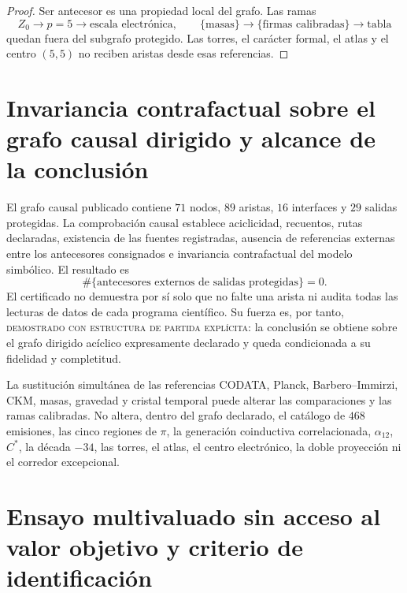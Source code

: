 \begin{proof}
Ser antecesor es una propiedad local del grafo. Las ramas
\[
 Z_0\longrightarrow p=5\longrightarrow\text{escala electrónica},
\qquad
 \{\text{masas}\}\longrightarrow\{\text{firmas calibradas}\}
 \longrightarrow\text{tabla}
\]
quedan fuera del subgrafo protegido. Las torres, el carácter formal, el
atlas y el centro \((5,5)\) no reciben aristas desde esas referencias.
\end{proof}

\section{Invariancia contrafactual sobre el grafo causal dirigido y alcance de la conclusión}
\label{sec:certificado-independencia-prospectiva}

El grafo causal publicado contiene \(71\) nodos, \(89\) aristas,
\(16\) interfaces y
\(29\) salidas protegidas. La comprobación causal establece aciclicidad, recuentos,
rutas declaradas, existencia de las fuentes registradas, ausencia de
referencias externas entre los antecesores consignados e invariancia
contrafactual del modelo simbólico. El resultado es
\[
 \#\{\text{antecesores externos de salidas protegidas}\}=0.
\]
El certificado no demuestra por sí solo que no falte una arista ni audita
todas las lecturas de datos de cada programa científico. Su fuerza es, por
tanto, \textsc{demostrado con estructura de partida explícita}: la conclusión
se obtiene sobre el grafo dirigido acíclico expresamente declarado y queda
condicionada a su fidelidad y completitud.

La sustitución simultánea de las referencias CODATA, Planck,
Barbero--Immirzi, CKM, masas, gravedad y cristal temporal puede alterar las
comparaciones y las ramas calibradas. No altera, dentro del grafo declarado,
el catálogo de \(468\) emisiones, las cinco regiones de \(\pi\), la
generación coinductiva correlacionada, \(\alpha_{12}\), \(C^\ast\), la década \(-34\), las torres,
el atlas, el centro electrónico, la doble proyección ni el corredor
excepcional.

\section{Ensayo multivaluado sin acceso al valor objetivo y criterio de identificación}
\label{sec:protocolo-ciego-multivaluado}

